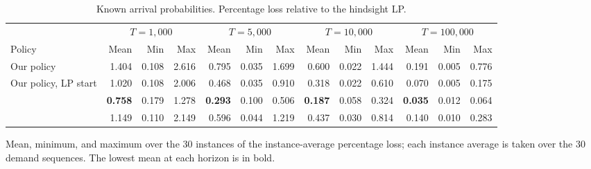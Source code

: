 \begin{table}[!htb]\centering
\caption{Known arrival probabilities. Percentage loss relative to the hindsight LP.}
\label{tab:numerical-known}
\begingroup\small\setlength{\tabcolsep}{2.4pt}
\begin{tabular*}{\linewidth}{@{}l@{\hspace{6pt}\extracolsep{\fill}}*{12}{r}@{}}\toprule
 & \multicolumn{3}{c}{$T=1{,}000$} & \multicolumn{3}{c}{$T=5{,}000$} & \multicolumn{3}{c}{$T=10{,}000$} & \multicolumn{3}{c}{$T=100{,}000$} \\
\cmidrule(lr){2-4}\cmidrule(lr){5-7}\cmidrule(lr){8-10}\cmidrule(lr){11-13}
Policy & Mean & Min & Max & Mean & Min & Max & Mean & Min & Max & Mean & Min & Max \\\midrule
Our policy & 1.404 & 0.108 & 2.616 & 0.795 & 0.035 & 1.699 & 0.600 & 0.022 & 1.444 & 0.191 & 0.005 & 0.776 \\
Our policy, LP start & 1.020 & 0.108 & 2.006 & 0.468 & 0.035 & 0.910 & 0.318 & 0.022 & 0.610 & 0.070 & 0.005 & 0.175 \\
\citet{vera_banerjee_2021} & \textbf{0.758} & 0.179 & 1.278 & \textbf{0.293} & 0.100 & 0.506 & \textbf{0.187} & 0.058 & 0.324 & \textbf{0.035} & 0.012 & 0.064 \\
\citet{he_wei_xu_yu_2025} & 1.149 & 0.110 & 2.149 & 0.596 & 0.044 & 1.219 & 0.437 & 0.030 & 0.814 & 0.140 & 0.010 & 0.283 \\
\bottomrule\end{tabular*}
\par\vspace{3pt}\raggedright\footnotesize
Mean, minimum, and maximum over the 30 instances of the instance-average percentage loss; each instance average is taken over the 30 demand sequences. The lowest mean at each horizon is in bold.
\par\endgroup\end{table}
